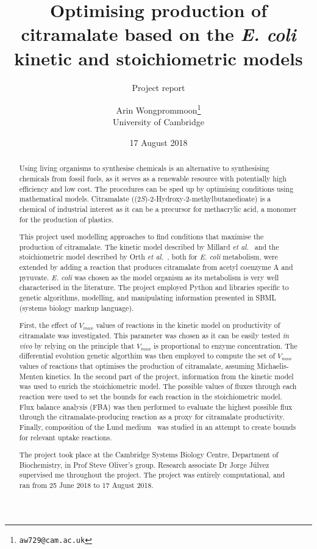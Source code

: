 \documentclass[parskip=full]{scrreprt}
\author{Arin Wongprommoon\thanks{\texttt{aw729@cam.ac.uk}} \\University of Cambridge}
\title{Optimising production of citramalate based on the \emph{E. coli} kinetic and stoichiometric models}
\subtitle{Project report}
\date{17 August 2018}
\begin{document}
\maketitle

\tableofcontents

\begin{abstract}
  Using living organisms to synthesise chemicals is an alternative to synthesising chemicals from fossil fuels, as it serves as a renewable resource with potentially high efficiency and low cost. The procedures can be sped up by optimising conditions using mathematical models. Citramalate ((2\emph{S})-2-Hydroxy-2-methylbutanedioate) is a chemical of industrial interest as it can be a precursor for methacrylic acid, a monomer for the production of plastics. 
  
  This project used modelling approaches to find conditions that maximise the production of citramalate. The kinetic model described by Millard \emph{et al.}~\cite{millard_metabolic_2017} and the stoichiometric model described by Orth \emph{et al.}~\cite{orth_comprehensive_2011}, both for \emph{E. coli} metabolism, were extended by adding a reaction that produces citramalate from acetyl coenzyme A and pyruvate. \emph{E. coli} was chosen as the model organism as its metabolism is very well characterised in the literature. The project employed Python and libraries specific to genetic algorithms, modelling, and manipulating information presented in SBML (systems biology markup language).
  
  First, the effect of $V_{max}$ values of reactions in the kinetic model on productivity of citramalate was investigated. This parameter was chosen as it can be easily tested \emph{in vivo} by relying on the principle that $V_{max}$ is proportional to enzyme concentration. The differential evolution genetic algorthim was then employed to compute the set of $V_{max}$ values of reactions that optimises the production of citramalate, assuming Michaelis-Menten kinetics. In the second part of the project, information from the kinetic model was used to enrich the stoichiometric model. The possible values of fluxes through each reaction were used to set the bounds for each reaction in the stoichiometric model. Flux balance analysis (FBA) was then performed to evaluate the highest possible flux through the citramalate-producing reaction as a proxy for citramalate productivity. Finally, composition of the Lund medium~\cite{eastham_process_2015} was studied in an attempt to create bounds for relevant uptake reactions.
  
  The project took place at the Cambridge Systems Biology Centre, Department of Biochemistry, in Prof Steve Oliver's group. Research associate Dr Jorge J\'ulvez supervised me throughout the project. The project was entirely computational, and ran from 25 June 2018 to 17 August 2018.
\end{abstract}
\end{document}
